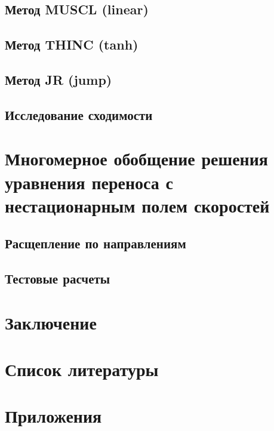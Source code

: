 \documentclass[12pt,a4paper]{article}
\begin{document}
\subsection{Метод MUSCL (linear)}


\subsection{Метод THINC (tanh)}


\subsection{Метод JR (jump)}


\subsection{Исследование сходимости}

\section{Многомерное обобщение решения уравнения переноса с нестационарным полем скоростей}
\subsection{Расщепление по направлениям}
\subsection{Тестовые расчеты}

\section{Заключение}

\section{Список литературы}

\section{Приложения}
\end{document}
